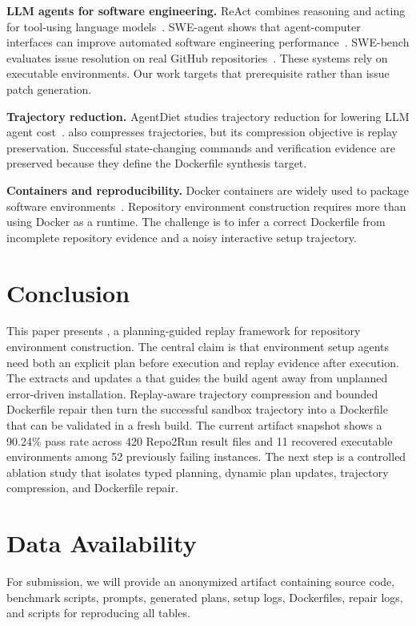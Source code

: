 \textbf{LLM agents for software engineering.}
ReAct combines reasoning and acting for tool-using language models~\cite{yao2023react}.
SWE-agent shows that agent-computer interfaces can improve automated software engineering performance~\cite{yang2024sweagent}.
SWE-bench evaluates issue resolution on real GitHub repositories~\cite{jimenez2024swebench}.
These systems rely on executable environments.
Our work targets that prerequisite rather than issue patch generation.

\textbf{Trajectory reduction.}
AgentDiet studies trajectory reduction for lowering LLM agent cost~\cite{xiao2025agentdiet}.
\tool also compresses trajectories, but its compression objective is replay preservation.
Successful state-changing commands and verification evidence are preserved because they define the Dockerfile synthesis target.

\textbf{Containers and reproducibility.}
Docker containers are widely used to package software environments~\cite{merkel2014docker}.
Repository environment construction requires more than using Docker as a runtime.
The challenge is to infer a correct Dockerfile from incomplete repository evidence and a noisy interactive setup trajectory.

\section{Conclusion}

This paper presents \tool, a planning-guided replay framework for repository environment construction.
The central claim is that environment setup agents need both an explicit plan before execution and replay evidence after execution.
The \planner extracts and updates a \ttg that guides the build agent away from unplanned error-driven installation.
Replay-aware trajectory compression and bounded Dockerfile repair then turn the successful sandbox trajectory into a Dockerfile that can be validated in a fresh build.
The current artifact snapshot shows a 90.24\% pass rate across 420 Repo2Run result files and 11 recovered executable environments among 52 previously failing instances.
The next step is a controlled ablation study that isolates typed planning, dynamic plan updates, trajectory compression, and Dockerfile repair.

\section*{Data Availability}

For submission, we will provide an anonymized artifact containing source code, benchmark scripts, prompts, generated plans, setup logs, Dockerfiles, repair logs, and scripts for reproducing all tables.





